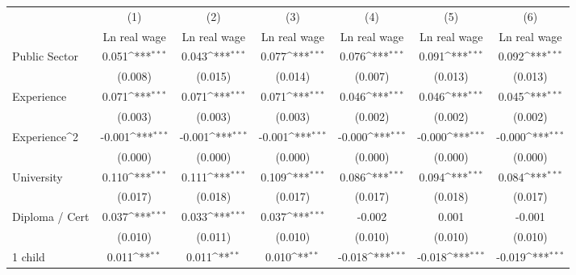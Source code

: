 {
\def\sym#1{\ifmmode^{#1}\else\(^{#1}\)\fi}
\begin{tabular}{l*{6}{c}}
\hline\hline
                    &\multicolumn{1}{c}{(1)}&\multicolumn{1}{c}{(2)}&\multicolumn{1}{c}{(3)}&\multicolumn{1}{c}{(4)}&\multicolumn{1}{c}{(5)}&\multicolumn{1}{c}{(6)}\\
                    &\multicolumn{1}{c}{Ln real wage}&\multicolumn{1}{c}{Ln real wage}&\multicolumn{1}{c}{Ln real wage}&\multicolumn{1}{c}{Ln real wage}&\multicolumn{1}{c}{Ln real wage}&\multicolumn{1}{c}{Ln real wage}\\
\hline
Public Sector       &       0.051\sym{***}&       0.043\sym{***}&       0.077\sym{***}&       0.076\sym{***}&       0.091\sym{***}&       0.092\sym{***}\\
                    &     (0.008)         &     (0.015)         &     (0.014)         &     (0.007)         &     (0.013)         &     (0.013)         \\
Experience          &       0.071\sym{***}&       0.071\sym{***}&       0.071\sym{***}&       0.046\sym{***}&       0.046\sym{***}&       0.045\sym{***}\\
                    &     (0.003)         &     (0.003)         &     (0.003)         &     (0.002)         &     (0.002)         &     (0.002)         \\
Experience^{2}      &      -0.001\sym{***}&      -0.001\sym{***}&      -0.001\sym{***}&      -0.000\sym{***}&      -0.000\sym{***}&      -0.000\sym{***}\\
                    &     (0.000)         &     (0.000)         &     (0.000)         &     (0.000)         &     (0.000)         &     (0.000)         \\
University          &       0.110\sym{***}&       0.111\sym{***}&       0.109\sym{***}&       0.086\sym{***}&       0.094\sym{***}&       0.084\sym{***}\\
                    &     (0.017)         &     (0.018)         &     (0.017)         &     (0.017)         &     (0.018)         &     (0.017)         \\
Diploma / Cert      &       0.037\sym{***}&       0.033\sym{***}&       0.037\sym{***}&      -0.002         &       0.001         &      -0.001         \\
                    &     (0.010)         &     (0.011)         &     (0.010)         &     (0.010)         &     (0.010)         &     (0.010)         \\
1 child             &       0.011\sym{**} &       0.011\sym{**} &       0.010\sym{**} &      -0.018\sym{***}&      -0.018\sym{***}&      -0.019\sym{***}\\

\end{tabular}}
